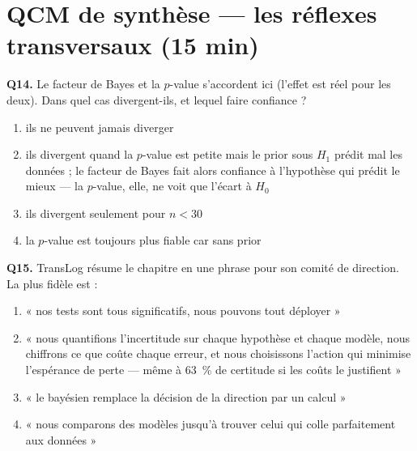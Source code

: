 \documentclass[11pt,a4paper]{article}
\begin{document}
\section{QCM de synthèse --- les réflexes transversaux (15 min)}

\begin{qcmbox}[Questions 14 et 15]
\textbf{Q14.} Le facteur de Bayes et la $p$-value s'accordent ici
(l'effet est réel pour les deux). Dans quel cas divergent-ils, et lequel
faire confiance ?
\begin{enumerate}[label=\Alph*.), leftmargin=8mm, itemsep=0.3mm]
  \item ils ne peuvent jamais diverger
  \item ils divergent quand la $p$-value est petite mais le prior sous $H_1$
        prédit mal les données ; le facteur de Bayes fait alors confiance à
        l'hypothèse qui prédit le mieux --- la $p$-value, elle, ne voit que
        l'écart à $H_0$
  \item ils divergent seulement pour $n < 30$
  \item la $p$-value est toujours plus fiable car sans prior
\end{enumerate}

\vspace{2mm}
\textbf{Q15.} TransLog résume le chapitre en une phrase pour son comité de
direction. La plus fidèle est :
\begin{enumerate}[label=\Alph*.), leftmargin=8mm, itemsep=0.3mm]
  \item « nos tests sont tous significatifs, nous pouvons tout déployer »
  \item « nous quantifions l'incertitude sur chaque hypothèse et chaque
        modèle, nous chiffrons ce que coûte chaque erreur, et nous choisissons
        l'action qui minimise l'espérance de perte --- même à 63~\% de
        certitude si les coûts le justifient »
  \item « le bayésien remplace la décision de la direction par un calcul »
  \item « nous comparons des modèles jusqu'à trouver celui qui colle
        parfaitement aux données »
\end{enumerate}
\end{qcmbox}
\end{document}
